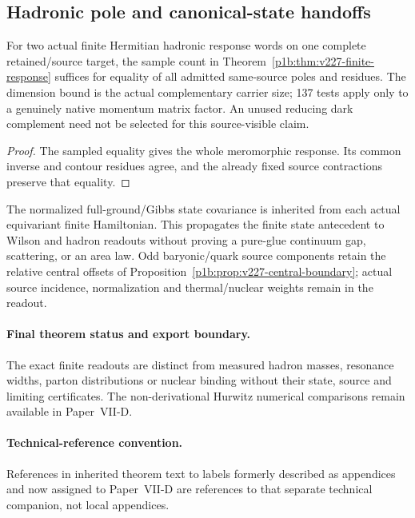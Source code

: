 \documentclass[12pt,a4paper]{article}
\begin{document}
\subsection{Hadronic pole and canonical-state handoffs}
\label{p11:sec:v227-hadron-response}
\begin{corollary}
\label{p11:cor:v227-hadron-response}
For two actual finite Hermitian hadronic response words on one complete
retained/source target, the sample count in
Theorem~\ref{p1b:thm:v227-finite-response} suffices for equality of all
admitted same-source poles and residues. The dimension bound is the actual
complementary carrier size; 137 tests apply only to a genuinely native
momentum matrix factor. An unused reducing dark complement need not be
selected for this source-visible claim.
\end{corollary}
\begin{proof}
The sampled equality gives the whole meromorphic response. Its common
inverse and contour residues agree, and the already fixed source
contractions preserve that equality.
\end{proof}
The normalized full-ground/Gibbs state covariance is inherited from each
actual equivariant finite Hamiltonian. This propagates the finite state
antecedent to Wilson and hadron readouts without proving a pure-glue
continuum gap, scattering, or an area law. Odd baryonic/quark source
components retain the relative central offsets of
Proposition~\ref{p1b:prop:v227-central-boundary}; actual source incidence,
normalization and thermal/nuclear weights remain in the readout.


\paragraph{Final theorem status and export boundary.}
The exact finite readouts are distinct from measured hadron masses, resonance widths, parton distributions or nuclear binding without their state, source and limiting certificates. The non-derivational Hurwitz numerical comparisons remain available in Paper~VII-D.

\paragraph{Technical-reference convention.} References in inherited theorem text to labels formerly described as appendices and now assigned to Paper~VII-D are references to that separate technical companion, not local appendices.
\end{document}
